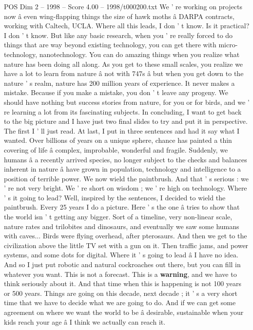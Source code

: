 \begin{textsample}{POS Dim 2 – 1998 – Score 4.00 – 1998/t000200.txt}
We ' re working on projects now â even wing-flapping things the size of hawk moths â DARPA contracts, working with Caltech, UCLA.
Where all this leads, I don ' t know.
Is it practical?
I don ' t know.
But like any basic research, when you ' re really forced to do things that are way beyond existing technology, you can get there with micro-technology, nanotechnology.
You can do amazing things when you realize what nature has been doing all along.
As you get to these small scales, you realize we have a lot to learn from nature â not with 747s â but when you get down to the nature ' s realm, nature has 200 million years of experience.
It never makes a mistake.
Because if you make a mistake, you don ' t leave any progeny.
We should have nothing but success stories from nature, for you or for birds, and we ' re learning a lot from its fascinating subjects.
In concluding, I want to get back to the big picture and I have just two final slides to try and put it in perspective.
The first I ' ll just read.
At last, I put in three sentences and had it say what I wanted.
Over billions of years on a unique sphere, chance has painted a thin covering of life â complex, improbable, wonderful and fragile.
Suddenly, we humans â a recently arrived species, no longer subject to the checks and balances inherent in nature â have grown in population, technology and intelligence to a position of terrible power.
We now wield the paintbrush.
And that ' s serious : we ' re not very bright.
We ' re short on wisdom ; we ' re high on technology.
Where ' s it going to lead?
Well, inspired by the sentences, I decided to wield the paintbrush.
Every 25 years I do a picture.
Here ' s the one â tries to show that the world isn ' t getting any bigger.
Sort of a timeline, very non-linear scale, nature rates and trilobites and dinosaurs, and eventually we saw some humans with caves...
Birds were flying overhead, after pterosaurs.
And then we get to the civilization above the little TV set with a gun on it.
Then traffic jams, and power systems, and some dots for digital.
Where it ' s going to lead â I have no idea.
And so I just put robotic and natural cockroaches out there, but you can fill in whatever you want.
This is not a forecast.
This is a \textbf{warning}, and we have to think seriously about it.
And that time when this is happening is not 100 years or 500 years.
Things are going on this decade, next decade ; it ' s a very short time that we have to decide what we are going to do.
And if we can get some agreement on where we want the world to be â desirable, sustainable when your kids reach your age â I think we actually can reach it.

\end{textsample}
